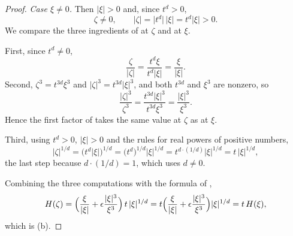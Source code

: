 \begin{proof}
\emph{Case $\xi\neq0$.}  Then $|\xi|>0$ and, since $t^{d}>0$,
\[
  \zeta\neq0,\qquad |\zeta|=\bigl|t^{d}\bigr|\,|\xi|=t^{d}|\xi|>0 .
\]
We compare the three ingredients of  at $\zeta$ and at
$\xi$.

First, since $t^{d}\neq0$,
\[
  \frac{\zeta}{|\zeta|}=\frac{t^{d}\xi}{t^{d}|\xi|}=\frac{\xi}{|\xi|} .
\]
Second, $\zeta^{3}=t^{3d}\xi^{3}$ and $|\zeta|^{3}=t^{3d}|\xi|^{3}$, and both
$t^{3d}$ and $\xi^{3}$ are nonzero, so
\[
  \frac{|\zeta|^{3}}{\zeta^{3}}=\frac{t^{3d}|\xi|^{3}}{t^{3d}\xi^{3}}
  =\frac{|\xi|^{3}}{\xi^{3}} .
\]
Hence the first factor of  takes the same value at $\zeta$
as at $\xi$.

Third, using $t^{d}>0$, $|\xi|>0$ and the rules for real powers of positive
numbers,
\[
  |\zeta|^{1/d}=\bigl(t^{d}|\xi|\bigr)^{1/d}
  =\bigl(t^{d}\bigr)^{1/d}|\xi|^{1/d}
  =t^{d\cdot(1/d)}|\xi|^{1/d}
  =t\,|\xi|^{1/d},
\]
the last step because $d\cdot(1/d)=1$, which uses $d\neq0$.

Combining the three computations with the formula of ,
\[
  H(\zeta)=\Bigl(\frac{\xi}{|\xi|}+\epsilon\frac{|\xi|^{3}}{\xi^{3}}\Bigr)\,t\,|\xi|^{1/d}
  =t\Bigl(\frac{\xi}{|\xi|}+\epsilon\frac{|\xi|^{3}}{\xi^{3}}\Bigr)|\xi|^{1/d}
  =t\,H(\xi),
\]
which is (b).
\end{proof}
